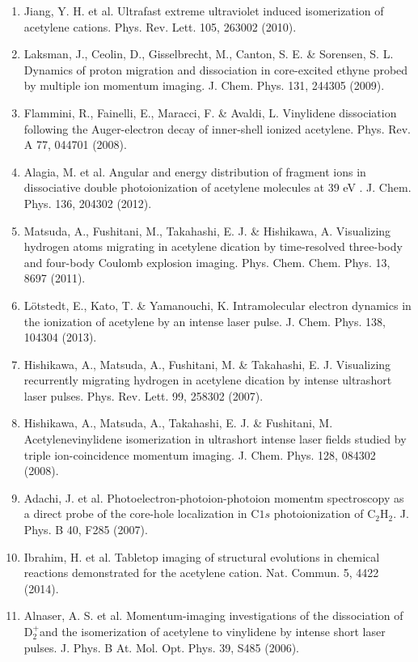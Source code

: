 \documentclass[10pt]{article}
\begin{document}
\begin{enumerate}
  \item Jiang, Y. H. et al. Ultrafast extreme ultraviolet induced isomerization of acetylene cations. Phys. Rev. Lett. 105, 263002 (2010).
  \item Laksman, J., Ceolin, D., Gisselbrecht, M., Canton, S. E. \& Sorensen, S. L. Dynamics of proton migration and dissociation in core-excited ethyne probed by multiple ion momentum imaging. J. Chem. Phys. 131, 244305 (2009).
  \item Flammini, R., Fainelli, E., Maracci, F. \& Avaldi, L. Vinylidene dissociation following the Auger-electron decay of inner-shell ionized acetylene. Phys. Rev. A 77, 044701 (2008).
  \item Alagia, M. et al. Angular and energy distribution of fragment ions in dissociative double photoionization of acetylene molecules at 39 eV . J. Chem. Phys. 136, 204302 (2012).
  \item Matsuda, A., Fushitani, M., Takahashi, E. J. \& Hishikawa, A. Visualizing hydrogen atoms migrating in acetylene dication by time-resolved three-body and four-body Coulomb explosion imaging. Phys. Chem. Chem. Phys. 13, 8697 (2011).
  \item Lötstedt, E., Kato, T. \& Yamanouchi, K. Intramolecular electron dynamics in the ionization of acetylene by an intense laser pulse. J. Chem. Phys. 138, 104304 (2013).
  \item Hishikawa, A., Matsuda, A., Fushitani, M. \& Takahashi, E. J. Visualizing recurrently migrating hydrogen in acetylene dication by intense ultrashort laser pulses. Phys. Rev. Lett. 99, 258302 (2007).
  \item Hishikawa, A., Matsuda, A., Takahashi, E. J. \& Fushitani, M. Acetylenevinylidene isomerization in ultrashort intense laser fields studied by triple ion-coincidence momentum imaging. J. Chem. Phys. 128, 084302 (2008).
  \item Adachi, J. et al. Photoelectron-photoion-photoion momentm spectroscopy as a direct probe of the core-hole localization in $\mathrm{C} 1 s$ photoionization of $\mathrm{C}_{2} \mathrm{H}_{2}$. J. Phys. B 40, F285 (2007).
  \item Ibrahim, H. et al. Tabletop imaging of structural evolutions in chemical reactions demonstrated for the acetylene cation. Nat. Commun. 5, 4422 (2014).
  \item Alnaser, A. S. et al. Momentum-imaging investigations of the dissociation of $\mathrm{D}_{2}^{+}$and the isomerization of acetylene to vinylidene by intense short laser pulses. J. Phys. B At. Mol. Opt. Phys. 39, S485 (2006).

\end{enumerate}
\end{document}
